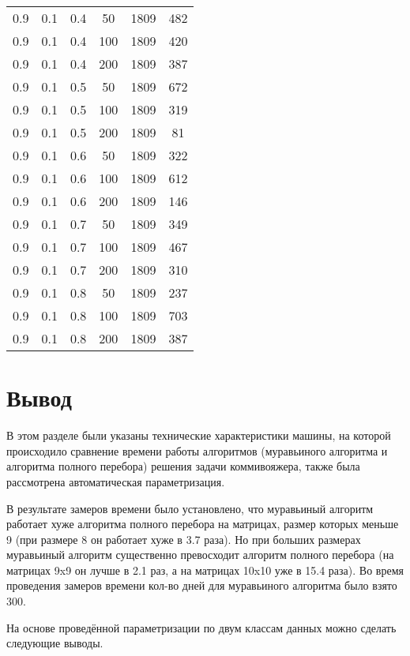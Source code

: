 \begin{center}
\begin{longtable}[c]{|c|c|c|c|c|c|}
	   \hline
		0.9 &  0.1 &  0.4 &   50 &  1809 &   482 \\
		0.9 &  0.1 &  0.4 &  100 &  1809 &   420 \\
		0.9 &  0.1 &  0.4 &  200 &  1809 &   387 \\
	   \hline
		0.9 &  0.1 &  0.5 &   50 &  1809 &   672 \\
		0.9 &  0.1 &  0.5 &  100 &  1809 &   319 \\
		0.9 &  0.1 &  0.5 &  200 &  1809 &    81 \\
	   \hline
		0.9 &  0.1 &  0.6 &   50 &  1809 &   322 \\
		0.9 &  0.1 &  0.6 &  100 &  1809 &   612 \\
		0.9 &  0.1 &  0.6 &  200 &  1809 &   146 \\
	   \hline
		0.9 &  0.1 &  0.7 &   50 &  1809 &   349 \\
		0.9 &  0.1 &  0.7 &  100 &  1809 &   467 \\
		0.9 &  0.1 &  0.7 &  200 &  1809 &   310 \\
	   \hline
		0.9 &  0.1 &  0.8 &   50 &  1809 &   237 \\
		0.9 &  0.1 &  0.8 &  100 &  1809 &   703 \\
		0.9 &  0.1 &  0.8 &  200 &  1809 &   387 \\
	   \hline	   
\end{longtable}
\end{center}

\clearpage

\section{Вывод}

В этом разделе были указаны технические характеристики машины, на которой происходило сравнение времени работы алгоритмов (муравьиного алгоритма и алгоритма полного перебора) решения задачи коммивояжера, также была рассмотрена автоматическая параметризация.

В результате замеров времени было установлено, что муравьиный алгоритм работает хуже алгоритма полного перебора на матрицах, размер которых меньше 9 (при размере 8 он работает хуже в 3.7 раза). Но при больших размерах муравьиный алгоритм существенно превосходит алгоритм полного перебора (на матрицах 9x9 он лучше в 2.1 раз, а на матрицах 10x10 уже в 15.4 раза). Во время проведения замеров времени кол-во дней для муравьиного алгоритма было взято 300.

На основе проведённой параметризации по двум классам данных можно сделать следующие выводы.

